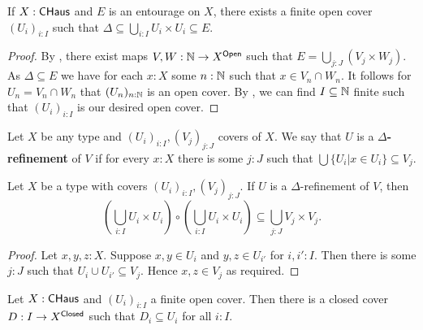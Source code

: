 \begin{lemma}\label{ReduceToFinite}
  If $X:\mathsf{CHaus}$ and $E$ is an entourage on $X$, there exists a finite open cover $(U_i)_{i:I}$ such that 
  $\Delta \subseteq \bigcup_{i:I} U_i \times U_i \subseteq E$. 
\end{lemma}
\begin{proof}
  By , there exist maps $V,W:\mathbb{N} \to X^{\mathsf{Open}}$ such that $E=\bigcup_{j:J} (V_j \times W_j)$. 
  As $\Delta \subseteq E$ we have for each $x:X$ some $n:\mathbb{N}$ such that $x\in V_n \cap W_n$. 
  It follows for $U_n = V_n \cap W_n$ that $(U_n)_{n:\mathbb{N}}$ is an open cover. 
  By , we can find $I\subseteq \mathbb{N}$ finite such that $(U_i)_{i:I}$ is our desired open cover. 
\end{proof}
\begin{definition}
  Let $X$ be any type and $(U_i)_{i:I},(V_j)_{j:J}$ covers of $X$. 
  We say that $U$ is a \textbf{$\Delta$-refinement} of $V$ if for every $x:X$ there is some $j:J$ such that $\bigcup\{U_i | x \in U_i\} \subseteq V_j$. 
\end{definition}
\begin{lemma}\label{ReducesToDelta}
  Let $X$ be a type with covers $(U_i)_{i:I},(V_j)_{j:J}$. If $U$ is a $\Delta$-refinement of $V$, then 
  $$\left(\bigcup_{i:I} U_i \times U_i\right) \circ \left(\bigcup_{i:I} U_i \times U_i\right) \subseteq \bigcup_{j:J} V_j \times V_j.$$
\end{lemma}
\begin{proof}
  Let $x,y,z:X$. Suppose $x,y \in U_i$ and $y,z \in U_{i'}$ for $i,i':I$. Then there is some $j:J$ such that $U_i \cup U_{i'} \subseteq V_j$. Hence $x,z\in V_j$ as required. 
\end{proof}
\begin{lemma}\label{closedSubcover}
  Let $X:\mathsf{CHaus}$ and $(U_i)_{i:I}$ a finite open cover. Then there is a closed cover $D: I \to X^{\mathsf{Closed}}$ such that $D_i\subseteq U_i$ for all $i:I$. 
\end{lemma}
